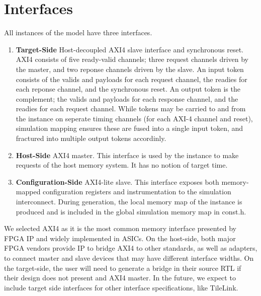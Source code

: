 \section{Interfaces}

All instances of the model have three interfaces.

\begin{enumerate}
    \item \textbf{Target-Side} Host-decoupled AXI4 slave
        interface and synchronous reset. AXI4 consists of five ready-valid
        channels; three request channels driven by the master, and two
        reponse channels driven by the slave.  An input token consists of
        the valids and payloads for each request channel, the readies for
        each reponse channel, and the synchronous reset.  An output token
        is the complement; the valids and payloads for each response
        channel, and the readies for each request channel.  While tokens
        may be carried to and from the instance on seperate timing channels
        (for each AXI-4 channel and reset), simulation mapping ensures
        these are fused into a single input token, and fractured into
        multiple output tokens accordinly.

    \item \textbf{Host-Side} AXI4 master. This interface is used by the instance
        to make requests of the host memory system. It has no notion of target time.

    \item \textbf{Configuration-Side} AXI4-lite slave. This interface exposes both
        memory-mapped configuration registers and instrumentation to the
        simulation interconnect. During generation, the local memory map of the
        instance is produced and is included in the global simulation memory map
        in const.h.

\end{enumerate}

We selected AXI4 as it is the most common memory interface presented by FPGA IP
and widely implemented in ASICs. On the host-side, both major FPGA vendors
provide IP to bridge AXI4 to other standards, as well as adapters, to connect
master and slave devices that may have different interface widths. On the
target-side, the user will need to generate a bridge in their source RTL if
their design does not present and AXI4 master. In the future, we expect to
include target side interfaces for other interface specifications, like
TileLink.

